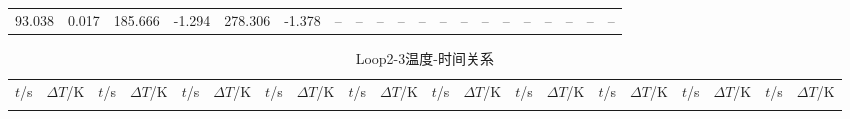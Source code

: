 \documentclass[cn,hazy,pku,12pt,normal,math=newtx,cite=super]{elegantnote}
\begin{document}
{\begin{longtable}{cc|cc|cc|cc|cc|cc|cc|cc|cc|cc}
      93.038 &               0.017 &      185.666 &              -1.294 &      278.306 &              -1.378 &          -- &                 -- &          -- &                 -- &          -- &                 -- &          -- &                 -- &          -- &                 -- &          -- &                 -- &          -- &                 -- \\
\end{longtable}
\begin{longtable}{cc|cc|cc|cc|cc|cc|cc|cc|cc|cc}
\toprule
\endhead

\caption{Loop2-3温度-时间关系}\\
\toprule
$t$/\si{s} & $\Delta T$/\si{K} & $t$/\si{s} & $\Delta T$/\si{K} & $t$/\si{s} & $\Delta T$/\si{K} & $t$/\si{s} & $\Delta T$/\si{K} & $t$/\si{s} & $\Delta T$/\si{K} & $t$/\si{s} & $\Delta T$/\si{K} & $t$/\si{s} & $\Delta T$/\si{K} & $t$/\si{s} & $\Delta T$/\si{K} & $t$/\si{s} & $\Delta T$/\si{K} & $t$/\si{s} & $\Delta T$/\si{K} \\
\midrule
\endfirsthead

\bottomrule
\endfoot


\end{longtable}}
\end{document}
